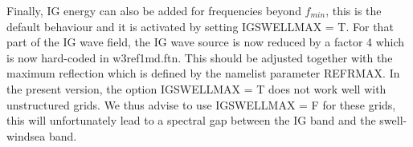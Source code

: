 Finally, IG energy can also be added for frequencies beyond $f_{min}$, this is the default behaviour 
and it is activated by setting {\code IGSWELLMAX = T}.  For that part of the IG wave
field, the IG wave source is now reduced by a factor 4 which is now hard-coded
in {\file w3ref1md.ftn}. This should be adjusted together with the maximum reflection 
which is defined by the namelist parameter {\code
REFRMAX}. In the present version, the option {\code IGSWELLMAX = T} does 
not work well with unstructured grids. We thus advise to use 
{\code IGSWELLMAX = F} for these grids, this will unfortunately lead 
to a spectral gap between the IG band and the swell-windsea band. 




